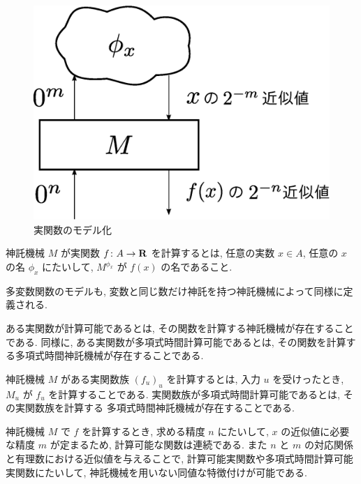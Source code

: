  \begin{figure}
  \label{fig:model-of-function}
  \begin{center}
   \includegraphics[height=0.15\textheight]{image/model-of-function.eps}
  \end{center}
  \caption{実関数のモデル化}
 \end{figure}

 \begin{definition}
  神託機械 $M$ が実関数 $f\colon A \to \mathbf R$ を計算するとは,
  任意の実数 $x \in A$, 任意の $x$ の名 $\phi_x$ にたいして,
  $M^{\phi_x}$ が $f(x)$ の名であること.
 \end{definition}

 多変数関数のモデルも, 変数と同じ数だけ神託を持つ神託機械によって同様に定義される.

 ある実関数が計算可能であるとは, その関数を計算する神託機械が存在することである.
 同様に, ある実関数が多項式時間計算可能であるとは, その関数を計算する多項式時間神託機械が存在することである.

 神託機械 $M$ がある実関数族 $(f_u)_u$ を計算するとは,
 入力 $u$ を受けったとき, $M_u$ が $f_u$ を計算することである.
 実関数族が多項式時間計算可能であるとは, その実関数族を計算する
 多項式時間神託機械が存在することである.
 

 神託機械 $M$ で $f$ を計算するとき, 求める精度 $n$ にたいして,
 $x$ の近似値に必要な精度 $m$ が定まるため,
 計算可能な関数は連続である.
 また $n$ と $m$ の対応関係と有理数における近似値を与えることで,
 計算可能実関数や多項式時間計算可能実関数にたいして,
 神託機械を用いない同値な特徴付けが可能である.

